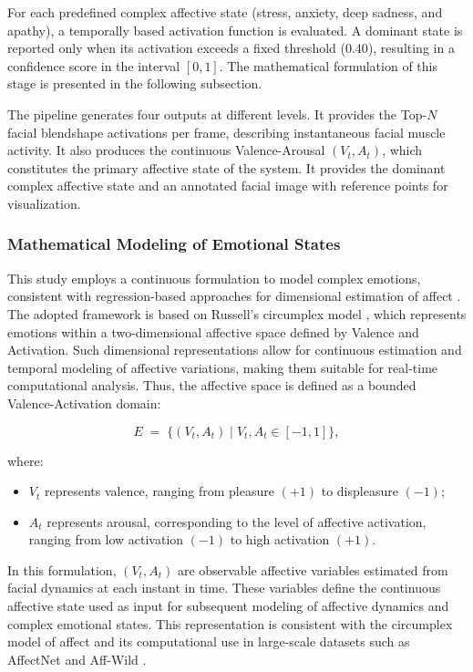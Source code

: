 \documentclass[letterpaper, 10 pt, conference]{ieeeconf}  %
\begin{document}
For each predefined complex affective state (stress, anxiety, deep sadness, and apathy), a temporally based activation function is evaluated. A dominant state is reported only when its activation exceeds a fixed threshold ($0.40$), resulting in a confidence score in the interval $[0,1]$. The mathematical formulation of this stage is presented in the following subsection.

The pipeline generates four outputs at different levels. It provides the Top-$N$ facial blendshape activations per frame, describing instantaneous facial muscle activity. It also produces the continuous Valence-Arousal $(V_t, A_t)$, which constitutes the primary affective state of the system. It provides the dominant complex affective state and an annotated facial image with reference points for visualization.

\subsubsection{Mathematical Modeling of Emotional States}

This study employs a continuous formulation to model complex emotions, consistent with regression-based approaches for dimensional estimation of affect \cite{kachele2014fusion, goncalves2024odyssey}. The adopted framework is based on Russell's circumplex model \cite{kim2018building}, which represents emotions within a two-dimensional affective space defined by Valence and Activation. Such dimensional representations allow for continuous estimation and temporal modeling of affective variations, making them suitable for real-time computational analysis. Thus, the affective space is defined as a bounded Valence-Activation domain:

\begin{equation}
{E} \;=\; \bigl\{ (V_t, A_t) \;\big|\; V_t, A_t \in [-1, 1] \bigr\},
\end{equation}

where:

\begin{itemize}
    \item[(i)] $V_t$ represents valence, ranging from pleasure $(+1)$ to displeasure $(-1)$;
    \item[(ii)] $A_t$ represents arousal, corresponding to the level of affective activation, ranging from low activation $(-1)$ to high activation $(+1)$.
\end{itemize}

In this formulation, $(V_t, A_t)$ are observable affective variables estimated from facial dynamics at each instant in time. These variables define the continuous affective state used as input for subsequent modeling of affective dynamics and complex emotional states. This representation is consistent with the circumplex model of affect and its computational use in large-scale datasets such as AffectNet \cite{mollahosseini2017affectnet} and Aff-Wild \cite{kollias2019deep}.
\end{document}
